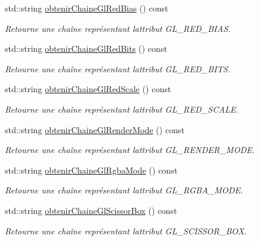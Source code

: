 \begin{DoxyCompactItemize}
std\+::string \hyperlink{group__utilitaire_ga4db73eaaf942ff5c5aa9b62e0386f9a9}{obtenir\+Chaine\+Gl\+Red\+Bias} () const 
\begin{DoxyCompactList}\small\item\em Retourne une chaîne représentant l\textquotesingle{}attribut G\+L\+\_\+\+R\+E\+D\+\_\+\+B\+I\+A\+S. \end{DoxyCompactList}\item 
std\+::string \hyperlink{group__utilitaire_gac4060a4139d031b9f8b9b1198c4a89f5}{obtenir\+Chaine\+Gl\+Red\+Bits} () const 
\begin{DoxyCompactList}\small\item\em Retourne une chaîne représentant l\textquotesingle{}attribut G\+L\+\_\+\+R\+E\+D\+\_\+\+B\+I\+T\+S. \end{DoxyCompactList}\item 
std\+::string \hyperlink{group__utilitaire_gae20713f3668cb6be662849b8de30d623}{obtenir\+Chaine\+Gl\+Red\+Scale} () const 
\begin{DoxyCompactList}\small\item\em Retourne une chaîne représentant l\textquotesingle{}attribut G\+L\+\_\+\+R\+E\+D\+\_\+\+S\+C\+A\+L\+E. \end{DoxyCompactList}\item 
std\+::string \hyperlink{group__utilitaire_ga64d9bf10216007aeb301d43ac14f82b4}{obtenir\+Chaine\+Gl\+Render\+Mode} () const 
\begin{DoxyCompactList}\small\item\em Retourne une chaîne représentant l\textquotesingle{}attribut G\+L\+\_\+\+R\+E\+N\+D\+E\+R\+\_\+\+M\+O\+D\+E. \end{DoxyCompactList}\item 
std\+::string \hyperlink{group__utilitaire_ga1596849dfe7b4606e0fc3ff9fbe00489}{obtenir\+Chaine\+Gl\+Rgba\+Mode} () const 
\begin{DoxyCompactList}\small\item\em Retourne une chaîne représentant l\textquotesingle{}attribut G\+L\+\_\+\+R\+G\+B\+A\+\_\+\+M\+O\+D\+E. \end{DoxyCompactList}\item 
std\+::string \hyperlink{group__utilitaire_ga58f683f150a231ec839aed3f79cd3ef2}{obtenir\+Chaine\+Gl\+Scissor\+Box} () const 
\begin{DoxyCompactList}\small\item\em Retourne une chaîne représentant l\textquotesingle{}attribut G\+L\+\_\+\+S\+C\+I\+S\+S\+O\+R\+\_\+\+B\+O\+X. \end{DoxyCompactList}\item 

\end{DoxyCompactItemize}
